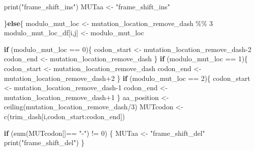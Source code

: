 \documentclass[
]{article}
\newenvironment{Shaded}{\begin{snugshade}}{\end{snugshade}}
\newcommand{\ControlFlowTok}[1]{\textcolor[rgb]{0.13,0.29,0.53}{\textbf{#1}}}
\newcommand{\DecValTok}[1]{\textcolor[rgb]{0.00,0.00,0.81}{#1}}
\newcommand{\FunctionTok}[1]{\textcolor[rgb]{0.00,0.00,0.00}{#1}}
\newcommand{\NormalTok}[1]{#1}
\newcommand{\OtherTok}[1]{\textcolor[rgb]{0.56,0.35,0.01}{#1}}
\newcommand{\SpecialCharTok}[1]{\textcolor[rgb]{0.00,0.00,0.00}{#1}}
\newcommand{\StringTok}[1]{\textcolor[rgb]{0.31,0.60,0.02}{#1}}
\begin{document}
\begin{Shaded}
\begin{Highlighting}[]
        \FunctionTok{print}\NormalTok{(}\StringTok{"frame\_shift\_ins"}\NormalTok{)}
\NormalTok{        MUTaa }\OtherTok{\textless{}{-}} \StringTok{"frame\_shift\_ins"}

\NormalTok{      \}}\ControlFlowTok{else}\NormalTok{\{}
\NormalTok{        modulo\_mut\_loc }\OtherTok{\textless{}{-}}\NormalTok{ mutation\_location\_remove\_dash }\SpecialCharTok{\%\%} \DecValTok{3}
\NormalTok{        modulo\_mut\_loc\_df[i,j] }\OtherTok{\textless{}{-}}\NormalTok{ modulo\_mut\_loc}
        
        \ControlFlowTok{if}\NormalTok{ (modulo\_mut\_loc }\SpecialCharTok{==} \DecValTok{0}\NormalTok{)\{}
\NormalTok{          codon\_start }\OtherTok{\textless{}{-}}\NormalTok{ mutation\_location\_remove\_dash}\DecValTok{{-}2}
\NormalTok{          codon\_end }\OtherTok{\textless{}{-}}\NormalTok{ mutation\_location\_remove\_dash}
\NormalTok{        \}}
        \ControlFlowTok{if}\NormalTok{ (modulo\_mut\_loc }\SpecialCharTok{==} \DecValTok{1}\NormalTok{)\{}
\NormalTok{          codon\_start }\OtherTok{\textless{}{-}}\NormalTok{ mutation\_location\_remove\_dash}
\NormalTok{          codon\_end }\OtherTok{\textless{}{-}}\NormalTok{ mutation\_location\_remove\_dash}\SpecialCharTok{+}\DecValTok{2}
\NormalTok{        \}}
        \ControlFlowTok{if}\NormalTok{ (modulo\_mut\_loc }\SpecialCharTok{==} \DecValTok{2}\NormalTok{)\{}
\NormalTok{          codon\_start }\OtherTok{\textless{}{-}}\NormalTok{ mutation\_location\_remove\_dash}\DecValTok{{-}1}
\NormalTok{          codon\_end }\OtherTok{\textless{}{-}}\NormalTok{ mutation\_location\_remove\_dash}\SpecialCharTok{+}\DecValTok{1}
\NormalTok{        \}}
\NormalTok{        aa\_position }\OtherTok{\textless{}{-}} \FunctionTok{ceiling}\NormalTok{(mutation\_location\_remove\_dash}\SpecialCharTok{/}\DecValTok{3}\NormalTok{)}
\NormalTok{        MUTcodon }\OtherTok{\textless{}{-}} \FunctionTok{c}\NormalTok{(trim\_dash[i,codon\_start}\SpecialCharTok{:}\NormalTok{codon\_end])}
        
        \ControlFlowTok{if}\NormalTok{ (}\FunctionTok{sum}\NormalTok{(MUTcodon[]}\SpecialCharTok{==} \StringTok{"{-}"}\NormalTok{) }\SpecialCharTok{!=} \DecValTok{0}\NormalTok{)}
\NormalTok{        \{}
\NormalTok{          MUTaa }\OtherTok{\textless{}{-}} \StringTok{"frame\_shift\_del"}
          \FunctionTok{print}\NormalTok{(}\StringTok{"frame\_shift\_del"}\NormalTok{)}
\NormalTok{        \}}
        

\end{Highlighting}
\end{Shaded}
\end{document}
